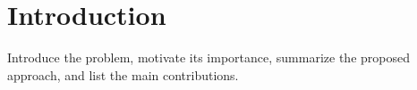 \section{Introduction}
\label{sec:introduction}

Introduce the problem, motivate its importance, summarize the proposed approach,
and list the main contributions.
